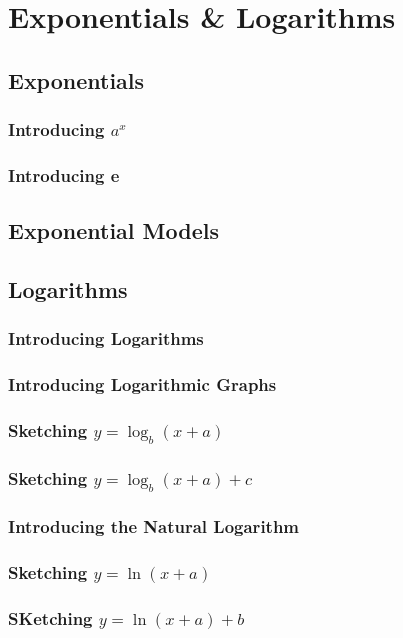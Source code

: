 \documentclass[../maths.tex]{subfiles}
\begin{document}
\chapter{Exponentials \& Logarithms}
\section{Exponentials}
\subsection*{Introducing \texorpdfstring{$a^x$}{a to the x}}
\subsection*{Introducing e}
\section{Exponential Models}
\section{Logarithms}
\subsection*{Introducing Logarithms}
\subsection*{Introducing Logarithmic Graphs}
\subsection*{Sketching \texorpdfstring{$y=\log_b(x+a)$}{ y = log of b(x+a)}}
\subsection*{Sketching \texorpdfstring{$y=\log_b(x+a)+c$}{y = log of b(x+a)+c}}
\subsection*{Introducing the Natural Logarithm}
\subsection*{Sketching \texorpdfstring{$y=\ln(x+a)$}{y = nautral log of (x+a)}}
\subsection*{SKetching \texorpdfstring{$y=\ln(x+a)+b$}{y = natural log of (x+a)+b}}
\end{document}
